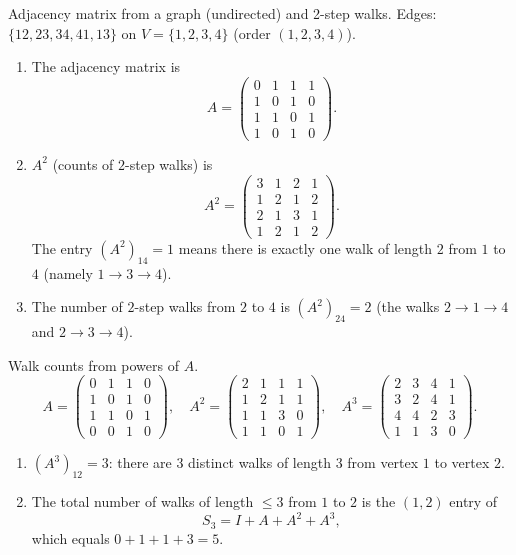 \documentclass[11pt]{article}
\def\textbf#1{#1}%
\begin{document}
\begin{solution}
\textbf{Adjacency matrix from a graph (undirected) and 2-step walks.}
Edges: $\{12,23,34,41,13\}$ on $V=\{1,2,3,4\}$ (order $(1,2,3,4)$).
\begin{enumerate}
  \item The adjacency matrix is
  \[
  A=\begin{pmatrix}
  0&1&1&1\\
  1&0&1&0\\
  1&1&0&1\\
  1&0&1&0
  \end{pmatrix}.
  \]
  \item \(A^2\) (counts of $2$-step walks) is
  \[
  A^2=\begin{pmatrix}
  3&1&2&1\\
  1&2&1&2\\
  2&1&3&1\\
  1&2&1&2
  \end{pmatrix}.
  \]
  The entry $(A^2)_{14}=1$ means there is exactly one walk of length $2$ from $1$ to $4$ (namely $1\!\to\!3\!\to\!4$).
  \item The number of $2$-step walks from $2$ to $4$ is $(A^2)_{24}=2$ (the walks $2\!\to\!1\!\to\!4$ and $2\!\to\!3\!\to\!4$).
\end{enumerate}
\end{solution}

\begin{solution}
\textbf{Walk counts from powers of \(A\).}
\[
A=\begin{pmatrix}
0&1&1&0\\
1&0&1&0\\
1&1&0&1\\
0&0&1&0
\end{pmatrix},\quad
A^2=\begin{pmatrix}
2&1&1&1\\
1&2&1&1\\
1&1&3&0\\
1&1&0&1
\end{pmatrix},\quad
A^3=\begin{pmatrix}
2&3&4&1\\
3&2&4&1\\
4&4&2&3\\
1&1&3&0
\end{pmatrix}.
\]
\begin{enumerate}
  \item $(A^3)_{12}=3$: there are $3$ distinct walks of length $3$ from vertex $1$ to vertex $2$.
  \item The total number of walks of length $\le3$ from $1$ to $2$ is the $(1,2)$ entry of
  \[
  S_3=I+A+A^2+A^3,
  \]
  which equals $0+1+1+3=5$.
\end{enumerate}
\end{solution}
\end{document}
